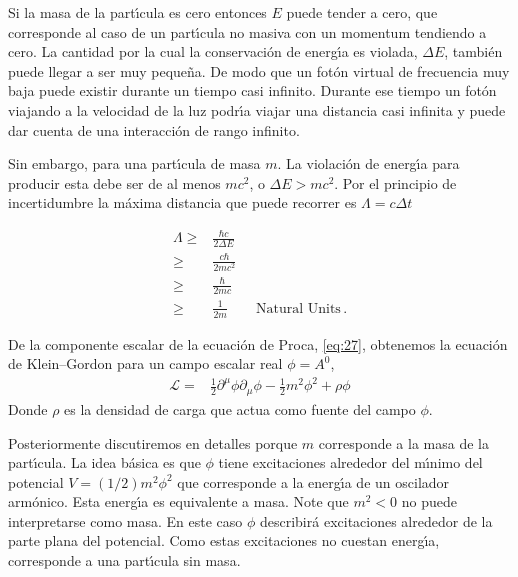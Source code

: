 Si la masa de la part\'\i cula es cero entonces $E$ puede tender a cero, que corresponde al caso de un part\'\i cula no masiva con un momentum tendiendo a cero. La cantidad por la cual la conservaci\'on de energ\'\i a es violada, $\Delta E$, tambi\'en puede llegar a ser muy peque\~na. De modo que un fot\'on virtual de frecuencia muy baja puede existir durante un tiempo casi infinito. Durante ese tiempo un fot\'on viajando a la velocidad de la luz podr\'\i a viajar una distancia casi infinita y puede dar cuenta de una interacci\'on de rango infinito. 

Sin embargo, para una part\'\i cula de masa $m$. La violaci\'on de energ\'\i a para producir esta debe ser de al menos $mc^2$, o $\Delta E>mc^2$. Por el principio de incertidumbre la m\'axima distancia que puede recorrer es $\Lambda=c\Delta t$

\begin{align}
\label{eq:244}
  \Lambda \geq & \frac{\hbar c}{2\Delta E}\nonumber\\
  \geq &\frac{c\hbar}{2mc^2}\nonumber\\
  \geq &\frac{\hbar}{2mc}\nonumber\\
  \geq &\frac{1}{2m}\qquad\text{Natural Units} \,.
\end{align}

De la componente escalar de la ecuaci\'on de Proca, \eqref{eq:27}, obtenemos la ecuaci\'on de Klein--Gordon para un campo escalar real $\phi=A^0$,
\begin{align}
  \label{eq:29}
  \mathcal{L}=&\frac{1}{2}\partial^\mu\phi\partial_\mu\phi-\frac{1}{2}m^2\phi^2+\rho\phi
\end{align}
Donde $\rho$ es la densidad de carga que actua como fuente del campo $\phi$.

Posteriormente discutiremos en detalles porque $m$ corresponde a la masa de la part\'\i cula. La idea b\'asica es que $\phi$ tiene excitaciones alrededor del m\'\i nimo del potencial $V=(1/2)m^2\phi^2$ que corresponde a la energ\'\i a de un oscilador arm\'onico. Esta energ\'\i a es equivalente a masa. Note que $m^2\lt 0$ no puede interpretarse como masa. En este caso $\phi$ describir\'a excitaciones alrededor de la parte plana del potencial. Como estas excitaciones no cuestan energ\'\i a, corresponde a una part\'\i cula sin masa. 

